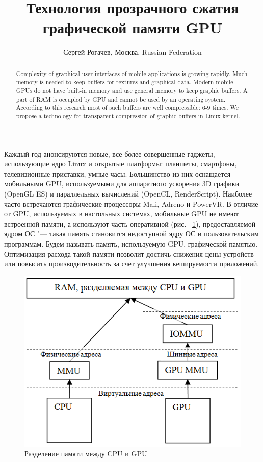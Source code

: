 \documentclass[10pt, a5paper]{article}
\begin{document}
\title{Технология прозрачного сжатия графической памяти GPU}
\author{Сергей Рогачев, Москва, Russian Federation}
\maketitle
\begin{abstract}
Complexity of graphical user interfaces of mobile applications is growing rapidly. Much memory is needed to keep buffers for textures and graphical data. Modern mobile GPUs do not have built-in memory and use general memory to keep graphic buffers. A part of RAM is occupied by GPU and cannot be used by an operating system. According to this research most of such buffers are well compressible: 6-9 times. We propose a technology for transparent compression of graphic buffers in Linux kernel.
\end{abstract}
Каждый год анонсируются новые, все более совершенные гаджеты, использующие ядро Linux и открытые платформы: планшеты, смартфоны, телевизионные приставки, умные часы. Большинство из них оснащается мобильными GPU, используемыми для аппаратного ускорения 3D графики (OpenGL ES) и параллельных вычислений (OpenCL, RenderScript). Наиболее часто встречаются графические процессоры Mali, Adreno и PowerVR. В отличие от GPU, используемых в настольных системах, мобильные GPU не имеют встроенной памяти, а используют часть оперативной (рис. ~\ref{Rogachev1}), предоставляемой ядром ОС "--- такая память становится недоступной ядру ОС и пользовательским программам. Будем называть память, используемую GPU, графической памятью. Оптимизация расхода такой памяти позволит достичь снижения цены устройств или повысить производительность за счет улучшения кешируемости приложений.

\begin{figure}[h!]
  \centering
  \includegraphics[]{18_2016_Rogachev1.png}
  \caption{Разделение памяти между CPU и GPU}
  \label{Rogachev1}
\end{figure}
\end{document}
